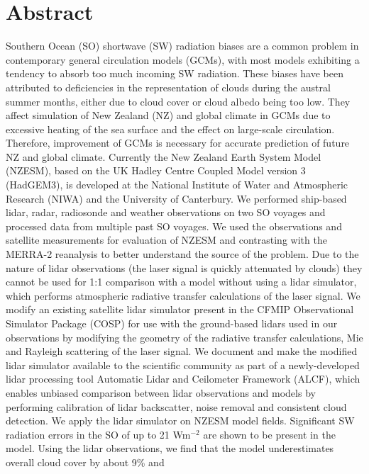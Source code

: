 \chapter*{Abstract}

\noindent
Southern Ocean (SO) shortwave (SW) radiation biases are a common
problem in contemporary general circulation models (GCMs), with most
models exhibiting a tendency to absorb too much incoming SW radiation.
These biases have been attributed to deficiencies in the representation of
clouds during the austral summer months, either due to cloud cover or cloud
albedo being too low. They affect simulation of New Zealand (NZ) and global
climate in GCMs due to excessive heating of the sea surface and the effect on
large-scale circulation. Therefore, improvement of GCMs is necessary for
accurate prediction of future NZ and global climate. Currently the New
Zealand Earth System Model (NZESM), based on the UK Hadley Centre
Coupled Model version 3 (HadGEM3), is developed at the National Institute
of Water and Atmospheric Research (NIWA) and the University of
Canterbury. We performed ship-based lidar, radar, radiosonde and weather
observations on two SO voyages and processed data from multiple past SO
voyages. We used the observations and satellite measurements for
evaluation of NZESM and contrasting with the MERRA-2 reanalysis to better
understand the source of the problem. Due to the nature of lidar
observations (the laser signal is quickly attenuated by clouds) they cannot be
used for 1:1 comparison with a model without using a lidar simulator, which
performs atmospheric radiative transfer calculations of the laser signal. We
modify an existing satellite lidar simulator present in the CFMIP
Observational Simulator Package (COSP) for use with the ground-based lidars
used in our observations by modifying the geometry of the radiative transfer
calculations, Mie and Rayleigh scattering of the laser signal. We document
and make the modified lidar simulator available to the scientific community
as part of a newly-developed lidar processing tool Automatic Lidar and
Ceilometer Framework (ALCF), which enables unbiased comparison between
lidar observations and models by performing calibration of lidar backscatter,
noise removal and consistent cloud detection. We apply the lidar simulator
on NZESM model fields. Significant SW radiation errors in the SO of up to 21
Wm$^{-2}$ are shown to be present in the model. Using the lidar observations,
we find that the model underestimates overall cloud cover by about 9\% and
